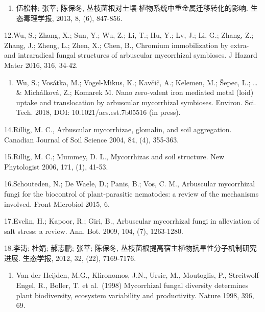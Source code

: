 \documentclass[
]{book}
\providecommand{\tightlist}{%
  \setlength{\itemsep}{0pt}\setlength{\parskip}{0pt}}
\begin{document}
\begin{enumerate}
\def\labelenumi{\arabic{enumi}.}
\setcounter{enumi}{10}
\tightlist
\item
  伍松林; 张莘; 陈保冬, 丛枝菌根对土壤-植物系统中重金属迁移转化的影响. 生态毒理学报, 2013, 8, (6), 847-856.
\end{enumerate}

12.Wu, S.; Zhang, X.; Sun, Y.; Wu, Z.; Li, T.; Hu, Y.; Lv, J.; Li, G.; Zhang, Z.; Zhang, J.; Zheng, L.; Zhen, X.; Chen, B., Chromium immobilization by extra- and intraradical fungal structures of arbuscular mycorrhizal symbioses. J Hazard Mater 2016, 316, 34-42.

\begin{enumerate}
\def\labelenumi{\arabic{enumi}.}
\setcounter{enumi}{12}
\tightlist
\item
  Wu, S.; Vosátka, M.; Vogel-Mikus, K.; Kavčič, A.; Kelemen, M.; Šepec, L.; \ldots{} \& Michálková, Z.; Komarek M. Nano zero-valent iron mediated metal (loid) uptake and translocation by arbuscular mycorrhizal symbioses. Environ. Sci. Tech. 2018, DOI: 10.1021/acs.est.7b05516 (in press).
\end{enumerate}

14.Rillig, M. C., Arbuscular mycorrhizae, glomalin, and soil aggregation. Canadian Journal of Soil Science 2004, 84, (4), 355-363.

15.Rillig, M. C.; Mummey, D. L., Mycorrhizas and soil structure. New Phytologist 2006, 171, (1), 41-53.

16.Schouteden, N.; De Waele, D.; Panis, B.; Vos, C. M., Arbuscular mycorrhizal fungi for the biocontrol of plant-parasitic nematodes: a review of the mechanisms involved. Front Microbiol 2015, 6.

17.Evelin, H.; Kapoor, R.; Giri, B., Arbuscular mycorrhizal fungi in alleviation of salt stress: a review. Ann. Bot. 2009, 104, (7), 1263-1280.

18.李涛; 杜娟; 郝志鹏; 张莘; 陈保冬, 丛枝菌根提高宿主植物抗旱性分子机制研究进展. 生态学报, 2012, 32, (22), 7169-7176.

\begin{enumerate}
\def\labelenumi{\arabic{enumi}.}
\setcounter{enumi}{18}
\tightlist
\item
  Van der Heijden, M.G., Klironomos, J.N., Ursic, M., Moutoglis, P., Streitwolf-Engel, R., Boller, T. et al.~(1998) Mycorrhizal fungal diversity determines plant biodiversity, ecosystem variability and productivity. Nature 1998, 396, 69.
\end{enumerate}
\end{document}
